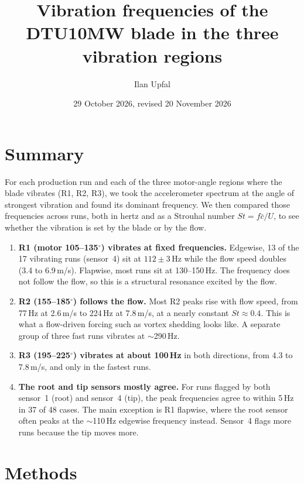 \documentclass[11pt]{article}
\title{Vibration frequencies of the DTU10MW blade in the three vibration regions}
\author{Ilan Upfal}
\date{29 October 2026, revised 20 November 2026}
\begin{document}
\maketitle

\section*{Summary}

For each production run and each of the three motor-angle regions where the
blade vibrates (R1, R2, R3), we took the accelerometer spectrum at the angle
of strongest vibration and found its dominant frequency. We then compared
those frequencies across runs, both in hertz and as a Strouhal number
$St = f\bar{c}/U$, to see whether the vibration is set by the blade or by the
flow.

\begin{enumerate}
  \item \textbf{R1 (motor 105--135$^\circ$) vibrates at fixed frequencies.}
        Edgewise, 13 of the 17 vibrating runs (sensor~4) sit at
        $112 \pm 3$\,Hz while the flow speed doubles (3.4 to 6.9\,m/s).
        Flapwise, most runs sit at 130--150\,Hz. The frequency does not follow
        the flow, so this is a structural resonance excited by the flow.
  \item \textbf{R2 (155--185$^\circ$) follows the flow.} Most R2 peaks rise
        with flow speed, from 77\,Hz at 2.6\,m/s to 224\,Hz at 7.8\,m/s, at a
        nearly constant $St \approx 0.4$. This is what a flow-driven forcing
        such as vortex shedding looks like. A separate group of three fast runs
        vibrates at $\sim$290\,Hz.
  \item \textbf{R3 (195--225$^\circ$) vibrates at about 100\,Hz} in both
        directions, from 4.3 to 7.8\,m/s, and only in the fastest runs.
  \item \textbf{The root and tip sensors mostly agree.} For runs flagged by
        both sensor~1 (root) and sensor~4 (tip), the peak frequencies agree to
        within 5\,Hz in 37 of 48 cases. The main exception is R1 flapwise,
        where the root sensor often peaks at the $\sim$110\,Hz edgewise
        frequency instead. Sensor~4 flags more runs because the tip moves
        more.
\end{enumerate}

\section{Methods}
\end{document}
